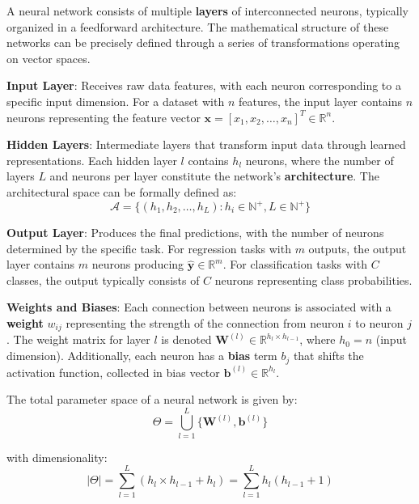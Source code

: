 \documentclass[11pt,a4paper]{report}
\begin{document}
A neural network consists of multiple \textbf{layers} of interconnected neurons, typically organized in a feedforward architecture. The mathematical structure of these networks can be precisely defined through a series of transformations operating on vector spaces.

\textbf{Input Layer}: Receives raw data features, with each neuron corresponding to a specific input dimension. For a dataset with $n$ features, the input layer contains $n$ neurons representing the feature vector $\mathbf{x} = [x_1, x_2, \ldots, x_n]^T \in \mathbb{R}^n$.

\textbf{Hidden Layers}: Intermediate layers that transform input data through learned representations. Each hidden layer $l$ contains $h_l$ neurons, where the number of layers $L$ and neurons per layer constitute the network's \textbf{architecture}. The architectural space can be formally defined as:
\begin{equation}
\mathcal{A} = \{(h_1, h_2, \ldots, h_L) : h_i \in \mathbb{N}^+, L \in \mathbb{N}^+\}
\end{equation}

\textbf{Output Layer}: Produces the final predictions, with the number of neurons determined by the specific task. For regression tasks with $m$ outputs, the output layer contains $m$ neurons producing $\hat{\mathbf{y}} \in \mathbb{R}^m$. For classification tasks with $C$ classes, the output typically consists of $C$ neurons representing class probabilities.

\textbf{Weights and Biases}: Each connection between neurons is associated with a \textbf{weight} $w_{ij}$ representing the strength of the connection from neuron $i$ to neuron $j$. The weight matrix for layer $l$ is denoted $\mathbf{W}^{(l)} \in \mathbb{R}^{h_l \times h_{l-1}}$, where $h_0 = n$ (input dimension). Additionally, each neuron has a \textbf{bias} term $b_j$ that shifts the activation function, collected in bias vector $\mathbf{b}^{(l)} \in \mathbb{R}^{h_l}$.

The total parameter space of a neural network is given by:
\begin{equation}
\Theta = \bigcup_{l=1}^{L} \{\mathbf{W}^{(l)}, \mathbf{b}^{(l)}\}
\end{equation}

with dimensionality:
\begin{equation}
|\Theta| = \sum_{l=1}^{L} (h_l \times h_{l-1} + h_l) = \sum_{l=1}^{L} h_l(h_{l-1} + 1)
\end{equation}
\end{document}
